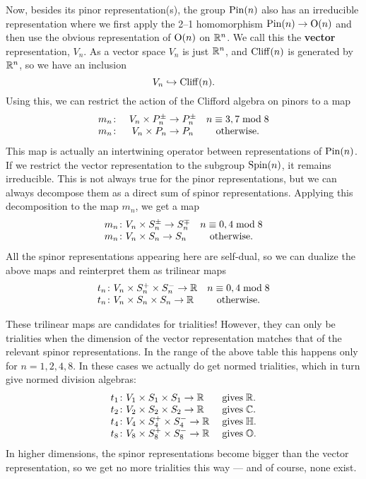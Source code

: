 Now, besides its pinor representation(s), the group ${\rm Pin}(n)$ also has
an irreducible representation where we first apply the 2--1 homomorphism
${\rm Pin}(n) \to {\rm O}(n)$ and then use the obvious representation of ${\rm O}(n)$
on ${\mathbb R}^n$.  We call this the {\bf vector} representation, $V_n$.  As a
vector space $V_n$ is just ${\mathbb R}^n$, and ${\rm Cliff}(n)$ is generated by
${\mathbb R}^n$, so we have an inclusion
\[                  V_n \hookrightarrow {\rm Cliff}(n)  .\]  
Using this, we can restrict the action of the Clifford algebra on pinors  
to a map  
\[    
\begin{array}{lcc}       
m_n \colon& V_n \times P_n^\pm \to P_n^\pm &n \equiv 3,7 \bmod 8  \\  
m_n \colon& V_n \times P_n \to P_n         & {\rm otherwise.}   
\end{array}   
\]  
This map is actually an intertwining operator between 
representations of ${\rm Pin}(n)$.  If we restrict the vector representation 
to the subgroup ${\rm Spin}(n)$, it remains irreducible.  This is not always 
true for the pinor representations, but we can always decompose them as 
a direct sum of spinor representations.  Applying this decomposition to 
the map $m_n$, we get a map 
\[    
\begin{array}{lc}        
m_n \colon V_n \times S_n^\pm \to S_n^\mp   &n \equiv 0,4 \bmod 8  \\   
m_n \colon V_n \times S_n \to S_n         & {\rm otherwise.}    
\end{array}    
\]   
All the spinor representations appearing here are self-dual, so we can  
dualize the above maps and reinterpret them as trilinear maps   
\[  
\begin{array}{lc}        
t_n \colon V_n \times S_n^+ \times S_n^- \to {\mathbb R}  & n \equiv 0,4 \bmod 8  \\   
t_n \colon V_n \times S_n \times S_n \to {\mathbb R}      & {\rm otherwise.}    
\end{array}   
\]   
 
These trilinear maps are candidates for trialities!  However, they can  
only be trialities when the dimension of the vector representation  
matches that of the relevant spinor representations.    In the range of  
the above table this happens only for $n = 1,2,4,8$.  In these cases we 
actually do get normed trialities, which in turn give normed division algebras: 
\[ 
\begin{array}{ll} 
  t_1 \colon V_1 \times S_1 \times S_1 \to {\mathbb R}  & 
{\rm \; gives \;} {\mathbb R}.   \\ 
   t_2 \colon V_2 \times S_2 \times S_2 \to {\mathbb R} & 
{\rm \; gives \;} {\mathbb C}.    \\ 
   t_4 \colon V_4 \times S_4^+ \times S_4^- \to {\mathbb R} & 
{\rm \; gives \;} {\mathbb H}.    \\ 
   t_8 \colon V_8 \times S_8^+ \times S_8^- \to {\mathbb R} & 
{\rm \; gives \;} {\mathbb O} .  
\end{array} 
\] 
In higher dimensions, the spinor representations become bigger than the 
vector representation, so we get no more trialities this way --- and of 
course, none exist.  
 
